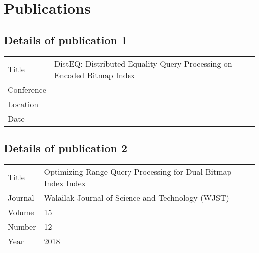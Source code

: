\documentclass[../main/thesis.tex]{subfiles}
\begin{document}
\chapter{Publications}
\section{Details of publication 1}
\noindent
\begin{center}
	\begin{tabular*}{\textwidth}{p{}|p{}}
		Title & DistEQ: Distributed Equality Query Processing on Encoded Bitmap Index \\
		Conference & \\
		Location & \\
		Date & \\
	\end{tabular*}
\end{center}

%

\section{Details of publication 2}
\noindent
\begin{center}
	\begin{tabular*}{\textwidth}{p{}|p{}}
		Title & Optimizing Range Query Processing for Dual Bitmap Index Index \\
		Journal & Walailak Journal of Science and Technology (WJST)\\
		Volume & 15 \\
		Number & 12 \\
		Year & 2018 \\
	\end{tabular*}
\end{center}

\end{document}
